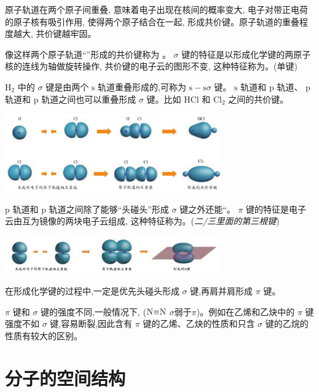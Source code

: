 \documentclass[10pt,cn]{elegantbook}
\begin{document}
原子轨道在两个原子间重叠, 意味着电子出现在核间的概率变大, 电子对带正电荷的原子核有吸引作用, 使得两个原子结合在一起, 形成共价键。原子轨道的重叠程度越大, 共价键越牢固。

像这样两个原子轨道“”形成的共价键称为 。 \(\sigma\) 键的特征是以形成化学键的两原子核的连线为轴做旋转操作, 共价键的电子云的图形不变, 这种特征称为。(单键)

\({\mathrm{H}}_{2}\) 中的 \(\sigma\) 键是由两个 \(\mathrm{s}\) 轨道重叠形成的,可称为 \(\mathrm{s} - \mathrm{s}\sigma\) 键。 \(\mathrm{s}\) 轨道和 \(\mathrm{p}\) 轨道、 \(\mathrm{p}\) 轨道和 \(\mathrm{p}\) 轨道之间也可以重叠形成 \(\sigma\) 键。比如 \(\mathrm{{HCl}}\) 和 \({\mathrm{{Cl}}}_{2}\) 之间的共价键。

\begin{center}
	\includegraphics[max width=0.7\textwidth]{image/c72-2.jpg}
\end{center}

\(\mathrm{p}\) 轨道和 \(\mathrm{p}\) 轨道之间除了能够“头碰头”形成 \(\sigma\) 键之外还能“。 \(\pi\) 键的特征是电子云由互为镜像的两块电子云组成, 这种特征称为。(\textit{二/三里面的第三根键})

\begin{center}
	\includegraphics[max width=0.7\textwidth]{image/c73.jpg}
\end{center}

在形成化学键的过程中,一定是优先头碰头形成 \(\sigma\) 键,再肩并肩形成 \(\pi\) 键。

\(\pi\) 键和 \(\sigma\) 键的强度不同,一般情况下, \textit{}($\ce{N#N}$ $\sigma $弱于$\pi$)。例如在乙烯和乙炔中的 \(\pi\) 键强度不如 \(\sigma\) 键,容易断裂,因此含有 \(\pi\) 键的乙烯、乙炔的性质和只含 \(\sigma\) 键的乙烷的性质有较大的区别。

\chapter{分子的空间结构}
\end{document}
